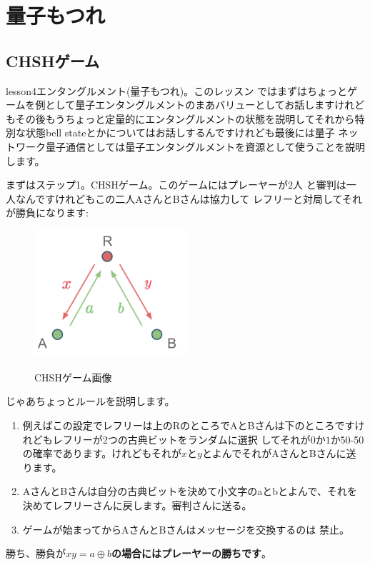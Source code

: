 \chapter[量子もつれ]
{量子もつれ}

\section{CHSHゲーム}
lesson4エンタングルメント(量子もつれ)。このレッスン
ではまずはちょっとゲームを例として量子エンタングルメントのまあバリューとしてお話しますけれどもその後もうちょっと定量的にエンタングルメントの状態を説明してそれから特別な状態bell stateとかについてはお話しするんですけれども最後には量子
ネットワーク量子通信としては量子エンタングルメントを資源として使うことを説明します。


まずはステップ1。CHSHゲーム。このゲームにはプレーヤーが2人
と審判は一人なんですけれどもこの二人AさんとBさんは協力して
レフリーと対局してそれが勝負になります:
\begin{figure}[H]
    \centering
    \includegraphics[width=0.5\textwidth]{lesson4/CHSH_diagram.pdf}
    \label{fig: 1}
    \begin{center}
        \caption{CHSHゲーム画像}
    \end{center}
\end{figure}
じゃあちょっとルールを説明します。
\begin{enumerate}
    \item 例えばこの設定でレフリーは上のRのところでAとBさんは下のところですけれどもレフリーが2つの古典ビットをランダムに選択
してそれが$0$か$1$か50-50の確率であります。けれどもそれが$x$と$y$とよんでそれがAさんとBさんに送ります。
    \item AさんとBさんは自分の古典ビットを決めて小文字のaとbとよんで、それを決めてレフリーさんに戻します。審判さんに送る。
    \item ゲームが始まってからAさんとBさんはメッセージを交換するのは
禁止。
\end{enumerate}
勝ち、勝負が\textbf{$x y = a \oplus b$の場合にはプレーヤーの勝ちです}。

